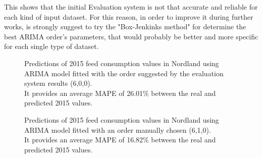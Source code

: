 This shows that the initial Evaluation system is not that accurate and reliable for each kind of input dataset. For this reason, in order to improve it during further works, is strongly suggest to try the "Box-Jenkinks method" for determine the best ARIMA order's parameters, that would probably be better and more specific for each single type of dataset.


\newpage

\begin{figure}[H]
    \caption[Predicted 2015 feed consumption in Nordland. Evaluation system ARIMA order.]{Predictions of 2015 feed consumption values in Nordland using ARIMA model fitted with the order suggested by the evaluation system results (6,0,0).\\  It provides an average MAPE of 26.01\% between the real and predicted 2015 values. }
    \label{fig: Nordland_ARIMAevaluation}
\end{figure}

\begin{figure}[H]
    \caption[Predicted 2015 feed consumption in Nordland. Manual ARIMA order.]{Predictions of 2015 feed consumption values in Nordland using ARIMA model fitted with an order manually chosen (6,1,0).\\  It provides an average MAPE of 16.82\% between the real and predicted 2015 values. }
    \label{fig: Nordland_ARIMAmanual}
\end{figure}


